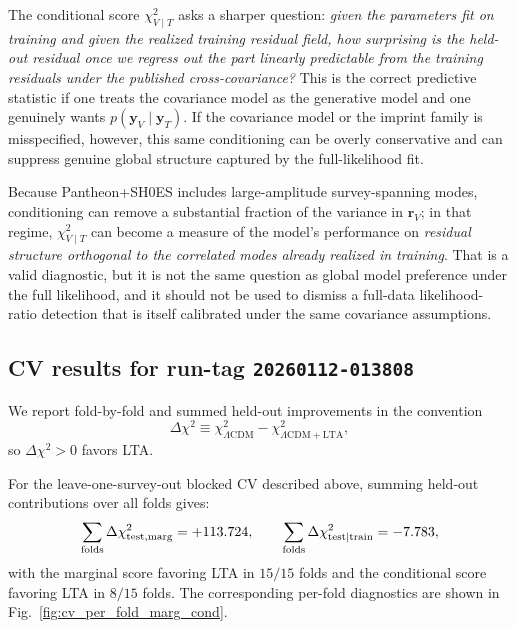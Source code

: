\documentclass[10pt]{article}
\begin{document}
The conditional score $\chi^2_{V\mid T}$ asks a sharper question: \emph{given the parameters fit on
training and given the realized training residual field, how surprising is the held-out residual
once we regress out the part linearly predictable from the training residuals under the published
cross-covariance?} This is the correct predictive statistic if one treats the covariance model as
the generative model and one genuinely wants $p(\bm{y}_V \mid \bm{y}_T)$.
If the covariance model or the imprint family is misspecified, however, this same conditioning can
be overly conservative and can suppress genuine global structure captured by the full-likelihood fit.

Because Pantheon+SH0ES includes large-amplitude survey-spanning modes, conditioning can remove a
substantial fraction of the variance in $\bm{r}_V$; in that regime, $\chi^2_{V\mid T}$ can become a
measure of the model's performance on \emph{residual structure orthogonal to the correlated modes
already realized in training}. That is a valid diagnostic, but it is not the same question as global
model preference under the full likelihood, and it should not be used to dismiss a full-data
likelihood-ratio detection that is itself calibrated under the same covariance assumptions.

\subsection{CV results for run-tag \texttt{20260112-013808}}
\label{app:cv:results}

We report fold-by-fold and summed held-out improvements in the convention
\begin{equation}
\Delta\chi^2 \equiv \chi^2_{\Lambda\mathrm{CDM}} - \chi^2_{\Lambda\mathrm{CDM+LTA}},
\end{equation}
so $\Delta\chi^2>0$ favors LTA.

For the leave-one-survey-out blocked CV described above, summing held-out contributions over all
folds gives:
\begin{equation}
\sum_{\rm folds}\Delta\chi^2_{\rm test,marg} = +113.724,
\qquad
\sum_{\rm folds}\Delta\chi^2_{\rm test\mid train} = -7.783,
\end{equation}
with the marginal score favoring LTA in $15/15$ folds and the conditional score favoring LTA in
$8/15$ folds. The corresponding per-fold diagnostics are shown in
Fig.~\ref{fig:cv_per_fold_marg_cond}.
\end{document}
